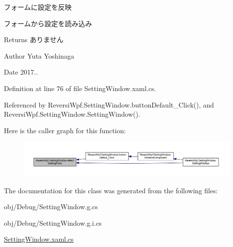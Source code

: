 フォームに設定を反映 

フォームから設定を読み込み

\begin{DoxyReturn}{Returns}
ありません 
\end{DoxyReturn}
\begin{DoxyAuthor}{Author}
Yuta Yoshinaga 
\end{DoxyAuthor}
\begin{DoxyDate}{Date}
2017.. 
\end{DoxyDate}


Definition at line 76 of file Setting\+Window.\+xaml.\+cs.



Referenced by Reversi\+Wpf.\+Setting\+Window.\+button\+Default\+\_\+\+Click(), and Reversi\+Wpf.\+Setting\+Window.\+Setting\+Window().

Here is the caller graph for this function\+:
\nopagebreak
\begin{figure}[H]
\begin{center}
\leavevmode
\includegraphics[width=350pt]{class_reversi_wpf_1_1_setting_window_aefc06dfe7cb0574c8a2d81eb343f13ed_icgraph}
\end{center}
\end{figure}


The documentation for this class was generated from the following files\+:\begin{DoxyCompactItemize}
\item 
obj/\+Debug/Setting\+Window.\+g.\+cs\item 
obj/\+Debug/Setting\+Window.\+g.\+i.\+cs\item 
\hyperlink{_setting_window_8xaml_8cs}{Setting\+Window.\+xaml.\+cs}\end{DoxyCompactItemize}

